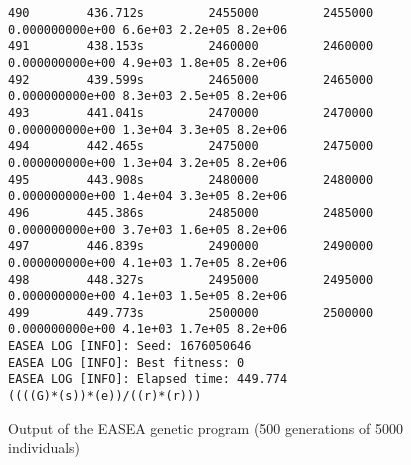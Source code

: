 \begin{figure}
    \begin{lstlisting}
490        436.712s         2455000         2455000 0.000000000e+00 6.6e+03 2.2e+05 8.2e+06
491        438.153s         2460000         2460000 0.000000000e+00 4.9e+03 1.8e+05 8.2e+06
492        439.599s         2465000         2465000 0.000000000e+00 8.3e+03 2.5e+05 8.2e+06
493        441.041s         2470000         2470000 0.000000000e+00 1.3e+04 3.3e+05 8.2e+06
494        442.465s         2475000         2475000 0.000000000e+00 1.3e+04 3.2e+05 8.2e+06
495        443.908s         2480000         2480000 0.000000000e+00 1.4e+04 3.3e+05 8.2e+06
496        445.386s         2485000         2485000 0.000000000e+00 3.7e+03 1.6e+05 8.2e+06
497        446.839s         2490000         2490000 0.000000000e+00 4.1e+03 1.7e+05 8.2e+06
498        448.327s         2495000         2495000 0.000000000e+00 4.1e+03 1.5e+05 8.2e+06
499        449.773s         2500000         2500000 0.000000000e+00 4.1e+03 1.7e+05 8.2e+06
EASEA LOG [INFO]: Seed: 1676050646
EASEA LOG [INFO]: Best fitness: 0
EASEA LOG [INFO]: Elapsed time: 449.774
((((G)*(s))*(e))/((r)*(r)))
\end{lstlisting}
    \caption{Output of the EASEA genetic program (500 generations of 5000
        individuals)}
    \label{gp_1}
\end{figure}



